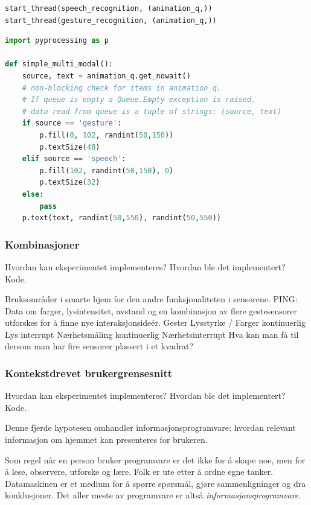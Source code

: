 \begin{lstlisting}[language=Python, caption=Talegjenkjenning]

\end{lstlisting}

\begin{lstlisting}[language=Python, caption=Kode Python starte trådene]
start_thread(speech_recognition, (animation_q,))
start_thread(gesture_recognition, (animation_q,))
\end{lstlisting}

\begin{lstlisting}[language=Python, caption=Kode Python multimodal]
import pyprocessing as p

def simple_multi_modal():
    source, text = animation_q.get_nowait()
    # non-blocking check for items in animation_q.
    # If queue is empty a Queue.Empty exception is raised.
    # data read from queue is a tuple of strings: (source, text)
    if source == 'gesture':
        p.fill(0, 102, randint(50,150))
        p.textSize(48)
    elif source == 'speech':
        p.fill(102, randint(50,150), 0)
        p.textSize(32)
    else:
        pass
    p.text(text, randint(50,550), randint(50,550))
\end{lstlisting}



\subsubsection{Kombinasjoner}
{\color{red}Hvordan kan eksperimentet implementeres? Hvordan ble det implementert? Kode.}

Bruksområder i smarte hjem for den andre funksjonaliteten i sensorene.
PING: Data om farger, lysintensitet, avstand og en kombinasjon av flere gestesensorer utforskes for å finne nye interaksjonsideér.
Gester
Lysstyrke / Farger kontinuerlig
Lys interrupt
Nærhetsmåling kontinuerlig
Nærhetsinterrupt
Hva kan man få til dersom man har fire sensorer plassert i et kvadrat?

\subsubsection{Kontekstdrevet brukergrensesnitt}
{\color{red}Hvordan kan eksperimentet implementeres? Hvordan ble det implementert? Kode.}

Denne fjerde hypotesen omhandler informasjonsprogramvare; hvordan relevant informasjon om hjemmet kan presenteres for brukeren.

Som regel når en person bruker programvare er det ikke for å skape noe, men for å lese, observere, utforske og lære. Folk er ute etter å ordne egne tanker. Datamaskinen er et medium for å spørre spørsmål, gjøre sammenligninger og dra konklusjoner. Det aller meste av programvare er altså \emph{informasjonsprogramvare}. 

